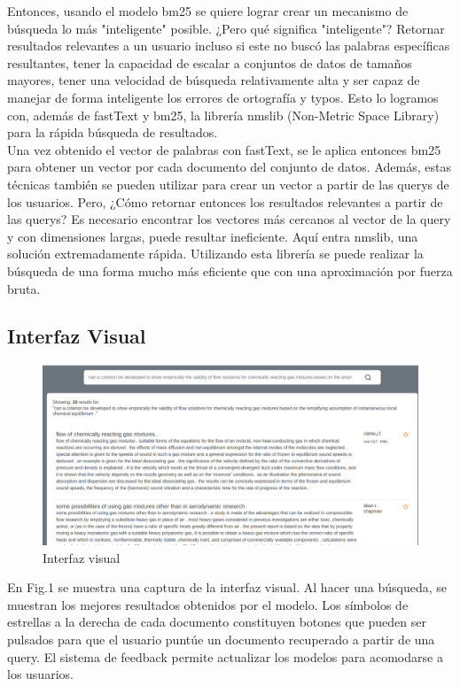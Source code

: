 \documentclass[runningheads,a4paper]{llncs}
\begin{document}
Entonces, usando el modelo bm25 se quiere lograr crear un mecanismo de búsqueda lo más "inteligente" posible. ¿Pero qué significa "inteligente"? Retornar resultados relevantes a un usuario incluso si este no buscó las palabras específicas resultantes, tener la capacidad de escalar a conjuntos de datos de tamaños mayores, tener una velocidad de búsqueda relativamente alta y ser capaz de manejar de forma inteligente los errores de ortografía y typos. Esto lo logramos con, además de fastText y bm25, la librería nmslib (Non-Metric Space Library) para la rápida búsqueda de resultados.\\

Una vez obtenido el vector de palabras con fastText, se le aplica entonces bm25 para obtener un vector por cada documento del conjunto de datos. Además, estas técnicas también se pueden utilizar para crear un vector a partir de las querys de los usuarios. Pero, ¿Cómo retornar entonces los resultados relevantes a partir de las querys? Es necesario encontrar los vectores más cercanos al vector de la query y con dimensiones largas, puede resultar ineficiente. Aquí entra nmslib, una solución extremadamente rápida. Utilizando esta librería se puede realizar la búsqueda de una forma mucho más eficiente que con una aproximación por fuerza bruta. 


\subsection*{Interfaz Visual}

\begin{figure}
	\centering
	\includegraphics[width=0.7\linewidth]{./visual-1.png}
	\caption{Interfaz visual}
	\label{fig:3}
\end{figure}

En Fig.1 se muestra una captura de la interfaz visual. Al hacer una búsqueda, se muestran los mejores resultados obtenidos por el modelo. Los símbolos de estrellas a la derecha de cada documento constituyen botones que pueden ser pulsados para que el usuario puntúe un documento recuperado a partir de una query. El sistema de feedback permite actualizar los modelos para acomodarse a los usuarios.
\end{document}
